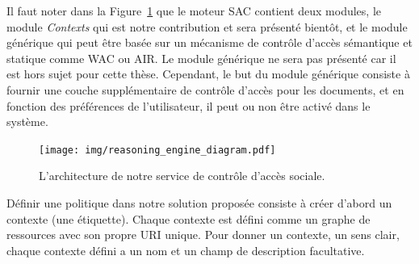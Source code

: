 \documentclass[a4paper]{article}
\begin{document}
Il faut noter dans la Figure~\ref{fig:acs_architecture} que le moteur SAC contient deux modules, le module \textit{Contexts} qui est notre contribution et sera présenté bientôt, et le module générique qui peut être basée sur un mécanisme de contrôle d'accès sémantique et statique comme WAC ou AIR. Le module générique ne sera pas présenté car il est hors sujet pour cette thèse. Cependant, le but du module générique consiste à fournir une couche supplémentaire de contrôle d'accès pour les documents, et en fonction des préférences de l'utilisateur, il peut ou non être activé dans le système.\\


\begin{figure}[h]
  \begin{center}
    \texttt{[image: img/reasoning\_engine\_diagram.pdf]}
        \caption{L'architecture de notre service de contrôle d'accès sociale.}
        \label{fig:acs_architecture}
  \end{center}
\end{figure}

Définir une politique dans notre solution proposée consiste à créer d'abord un contexte (une étiquette). Chaque contexte est défini comme un graphe de ressources avec son propre URI unique. Pour donner un contexte, un sens clair, chaque contexte défini a un nom et un champ de description facultative.\\
\end{document}
